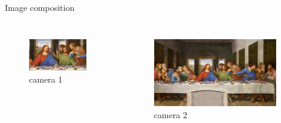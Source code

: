 \documentclass[hyperref={pdfpagelabels=false},aspectratio=169]{beamer}
\begin{document}
\begin{frame}{Image composition} 	%
	\begin{columns}[T,onlytextwidth]
	\begin{figure} 
		\centering
		\def\svgwidth{1\textwidth}
		\includegraphics[width=0.9\textwidth]{closeup.jpg} \\ camera 1
	\end{figure}
	\begin{figure} 
		\centering
		\def\svgwidth{1\textwidth}
		\includegraphics[width=0.93\textwidth]{medium.jpg} \\ camera 2
	\end{figure}
\end{columns}
\end{frame}
\end{document}
